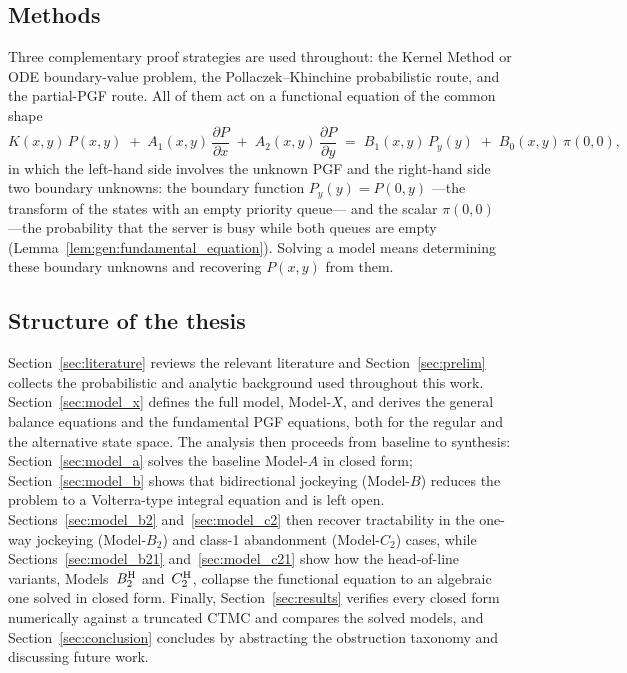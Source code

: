 \subsection*{Methods}

Three complementary proof strategies are used throughout: the Kernel Method or ODE boundary-value problem, the Pollaczek--Khinchine probabilistic route, and the partial-PGF route. All of them act on a functional equation of the common shape
\begin{equation*}
    K(x,y)\,P(x,y) \;+\; A_1(x,y)\,\frac{\partial P}{\partial x} \;+\; A_2(x,y)\,\frac{\partial P}{\partial y}
    \;=\; B_1(x,y)\,P_y(y) \;+\; B_0(x,y)\,\pi(0,0),
\end{equation*}
in which the left-hand side involves the unknown PGF and the right-hand side two boundary unknowns: the boundary function $P_y(y)=P(0,y)$ ---the transform of the states with an empty priority queue--- and the scalar $\pi(0,0)$ ---the probability that the server is busy while both queues are empty (Lemma~\ref{lem:gen:fundamental_equation}). Solving a model means determining these boundary unknowns and recovering $P(x,y)$ from them.


\subsection*{Structure of the thesis}

Section~\ref{sec:literature} reviews the relevant literature and Section~\ref{sec:prelim} collects the probabilistic and analytic background used throughout this work. Section~\ref{sec:model_x} defines the full model, Model-$X$, and derives the general balance equations and the fundamental PGF equations, both for the regular and the alternative state space. The analysis then proceeds from baseline to synthesis: Section~\ref{sec:model_a} solves the baseline Model-$A$ in closed form; Section~\ref{sec:model_b} shows that bidirectional jockeying (Model-$B$) reduces the problem to a Volterra-type integral equation and is left open. Sections~\ref{sec:model_b2} and~\ref{sec:model_c2} then recover tractability in the one-way jockeying (Model-$B_2$) and class-1 abandonment (Model-$C_2$) cases, while Sections~\ref{sec:model_b21} and~\ref{sec:model_c21} show how the head-of-line variants, Models~$B_2^{\mathrm{H}}$ and~$C_2^{\mathrm{H}}$, collapse the functional equation to an algebraic one solved in closed form. Finally, Section~\ref{sec:results} verifies every closed form numerically against a truncated CTMC and compares the solved models, and Section~\ref{sec:conclusion} concludes by abstracting the obstruction taxonomy and discussing future work.
